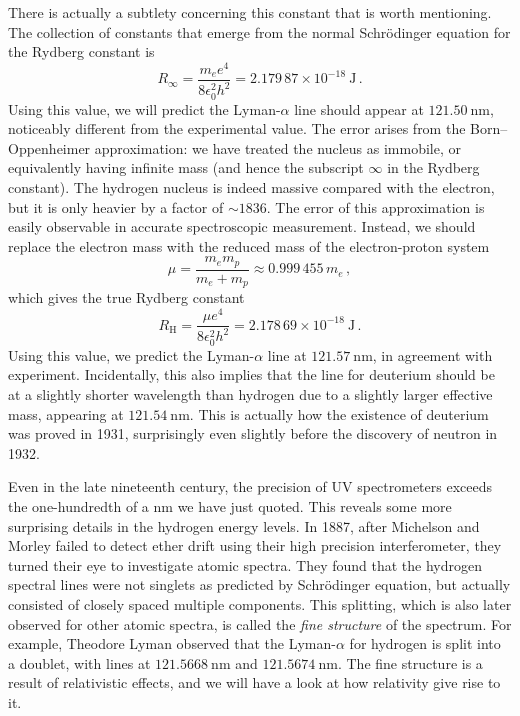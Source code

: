 \documentclass{article}
\theoremstyle{plain}\theoremheaderfont{\normalfont\itshape}\theorembodyfont{\rmfamily}\theoremseparator{.}\newtheorem*{rem}{Remark}\newtheorem*{ex}{Example}\newtheorem*{proof}{Proof}\newtheorem*{altp}{Alternative proof}
\theoremstyle{plain}\theoremheaderfont{\normalfont\bfseries}\theorembodyfont{\rmfamily}\theoremseparator{.}\newtheorem{thm}{Theorem}[section]\newtheorem{lem}[thm]{Lemma}\newtheorem{prop}[thm]{Proposition}\newtheorem*{cor}{Corollary}\newtheorem{defn}[thm]{Definition}\newtheorem{clm}[thm]{Claim}\newtheorem{clminproof}{Claim}
\theoremstyle{break}\theoremheaderfont{\normalfont\itshape}\theorembodyfont{\rmfamily}\theoremseparator{.\medskip}\newtheorem*{proofskip}{Proof}\newtheorem*{exs}{Examples}\newtheorem*{rems}{Remarks}
\theoremstyle{break}\theoremheaderfont{\normalfont\bfseries}\theorembodyfont{\rmfamily}\theoremseparator{.\medskip}\newtheorem{lemskip}[thm]{Lemma}\newtheorem{defnskip}[thm]{Definition}\newtheorem{propskip}[thm]{Proposition}\newtheorem{thmskip}[thm]{Theorem}
\numberwithin{equation}{section}
\newcommand{\unit}[1]{\ \mathrm{#1}}
\begin{document}
    There is actually a subtlety concerning this constant that is worth mentioning. The collection of constants that emerge from the normal Schr\"{o}dinger equation for the Rydberg constant is
    \begin{equation}
        R_\infty=\frac{m_e e^4}{8\epsilon_0^2 h^2}=2.179\,87\times 10^{-18}\unit{J}\,.
    \end{equation}
    Using this value, we will predict the Lyman-\(\alpha\) line should appear at \(121.50\unit{nm}\), noticeably different from the experimental value. The error arises from the Born--Oppenheimer approximation: we have treated the nucleus as immobile, or equivalently having infinite mass (and hence the subscript \(\infty\) in the Rydberg constant). The hydrogen nucleus is indeed massive compared with the electron, but it is only heavier by a factor of \(\sim 1836\). The error of this approximation is easily observable in accurate spectroscopic measurement. Instead, we should replace the electron mass with the reduced mass of the electron-proton system
    \begin{equation}
        \mu=\frac{m_e m_p}{m_e+m_p}\approx 0.999\,455\, m_e\,,
    \end{equation}
    which gives the true Rydberg constant
    \begin{equation}
        R_{\mathrm{H}}=\frac{\mu e^4}{8\epsilon_0^2 h^2}=2.178\,69\times 10^{-18}\unit{J}\,.
    \end{equation}
    Using this value, we predict the Lyman-\(\alpha\) line at \(121.57\unit{nm}\), in agreement with experiment. Incidentally, this also implies that the line for deuterium should be at a slightly shorter wavelength than hydrogen due to a slightly larger effective mass, appearing at \(121.54\unit{nm}\). This is actually how the existence of deuterium was proved in 1931, surprisingly even slightly before the discovery of neutron in 1932.

    Even in the late nineteenth century, the precision of UV spectrometers exceeds the one-hundredth of a \(\mathrm{nm}\) we have just quoted. This reveals some more surprising details in the hydrogen energy levels. In 1887, after Michelson and Morley failed to detect ether drift using their high precision interferometer, they turned their eye to investigate atomic spectra. They found that the hydrogen spectral lines were not singlets as predicted by Schr\"{o}dinger equation, but actually consisted of closely spaced multiple components. This splitting, which is also later observed for other atomic spectra, is called the \textit{fine structure} of the spectrum. For example, Theodore Lyman observed that the Lyman-\(\alpha\) for hydrogen is split into a doublet, with lines at \(121.5668\unit{nm}\) and \(121.5674\unit{nm}\). The fine structure is a result of relativistic effects, and we will have a look at how relativity give rise to it.
\end{document}
